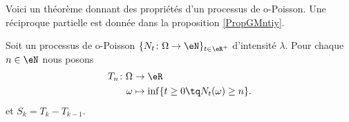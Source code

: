 Voici un théorème donnant des propriétés d'un processus de o-Poisson. Une réciproque partielle est donnée dans la proposition \ref{PropGMntiy}.
\begin{theorem}     \label{THOooYRIMooSREVEO}
	Soit un processus de o-Poisson \(  \{ N_t\colon \Omega\to \eN \}_{t\in \eR^+}  \) d'intensité \( \lambda\). Pour chaque \( n\in \eN\) nous posons
	\begin{equation}
		\begin{aligned}
			T_n\colon \Omega & \to \eR                                         \\
			\omega           & \mapsto \inf\{ t\geq 0\tq N_t(\omega)\geq n \}.
		\end{aligned}
	\end{equation}
	et \( S_k=T_k-T_{k-1}\).



\end{theorem}
